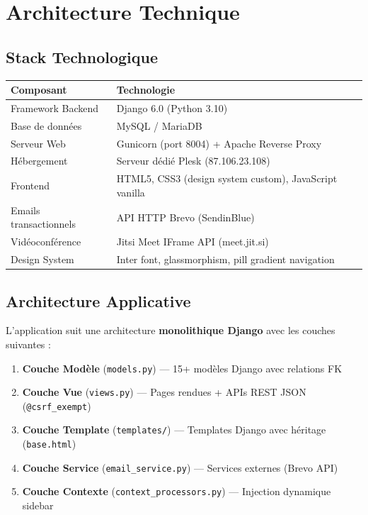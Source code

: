 \documentclass[12pt,a4paper]{article}
\begin{document}
\section{Architecture Technique}

\subsection{Stack Technologique}

\begin{techbox}
\begin{tabularx}{\textwidth}{lX}
\toprule
\textbf{Composant} & \textbf{Technologie} \\
\midrule
Framework Backend & Django 6.0 (Python 3.10) \\
Base de données & MySQL / MariaDB \\
Serveur Web & Gunicorn (port 8004) + Apache Reverse Proxy \\
Hébergement & Serveur dédié Plesk (87.106.23.108) \\
Frontend & HTML5, CSS3 (design system custom), JavaScript vanilla \\
Emails transactionnels & API HTTP Brevo (SendinBlue) \\
Vidéoconférence & Jitsi Meet IFrame API (meet.jit.si) \\
Design System & Inter font, glassmorphism, pill gradient navigation \\
\bottomrule
\end{tabularx}
\end{techbox}

\subsection{Architecture Applicative}

L'application suit une architecture \textbf{monolithique Django} avec les couches suivantes :

\begin{enumerate}[leftmargin=2em]
    \item \textbf{Couche Modèle} (\texttt{models.py}) — 15+ modèles Django avec relations FK
    \item \textbf{Couche Vue} (\texttt{views.py}) — Pages rendues + APIs REST JSON (\texttt{@csrf\_exempt})
    \item \textbf{Couche Template} (\texttt{templates/}) — Templates Django avec héritage (\texttt{base.html})
    \item \textbf{Couche Service} (\texttt{email\_service.py}) — Services externes (Brevo API)
    \item \textbf{Couche Contexte} (\texttt{context\_processors.py}) — Injection dynamique sidebar
\end{enumerate}
\end{document}
